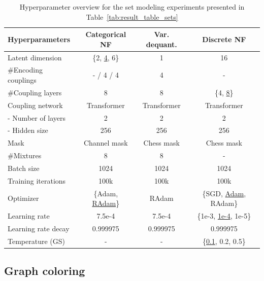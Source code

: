 \begin{table}[ht!]
    \centering
    \caption[Hyperparameter overview for the set modeling experiments]{Hyperparameter overview for the set modeling experiments presented in Table~\ref{tab:result_table_sets}}
    \label{tab:appendix_hyperparameters_sets}
    \renewcommand{\arraystretch}{1.2}
    \begin{tabular}{lccc}
        \toprule
        \textbf{Hyperparameters} & \textbf{Categorical NF} & \textbf{Var. dequant.} & \textbf{Discrete NF}\\
        \midrule
        Latent dimension & \{2, \underline{4}, 6\} & 1 & 16\\
        \#Encoding couplings & - / 4 / 4 & 4 & - \\
        \#Coupling layers & 8 & 8 & \{4, \underline{8}\} \\
        Coupling network & Transformer & Transformer & Transformer \\
        - Number of layers & 2 & 2 & 2 \\
        - Hidden size & 256 & 256 & 256 \\
        Mask & Channel mask & Chess mask & Chess mask\\
        \#Mixtures & 8 & 8 & - \\
        Batch size & 1024 & 1024 & 1024\\
        Training iterations & 100k & 100k & 100k\\
        Optimizer & \{Adam, \underline{RAdam}\} & RAdam & \{SGD, \underline{Adam}, RAdam\}\\
        Learning rate & 7.5e-4 & 7.5e-4 & \{1e-3, \underline{1e-4}, 1e-5\} \\
        Learning rate decay & 0.999975 & 0.999975 & 0.999975\\
        Temperature (GS) & - & - &  \{\underline{0.1}, 0.2, 0.5\}\\
        \bottomrule
    \end{tabular}
\end{table}

\subsection{Graph coloring}
\label{sec:appendix_hyperparams_graph_coloring}

